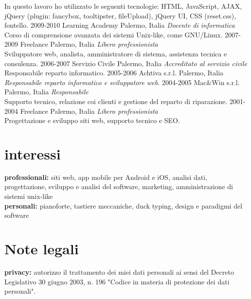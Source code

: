 \documentclass[]{friggeri-cv} %
\begin{document}
\begin{entrylist}
{In questo lavoro ho utilizzato le seguenti tecnologie: HTML,
JavaScript, AJAX, jQuery (plugin: fancybox, tooltipster, fileUpload),
jQuery UI, CSS (reset.css), fontello.
}
\entry
{2009-2010}
{Learning Academy}
{Palermo, Italia}
{\emph{Docente di informatica} \\
Corso di comprensione avanzata dei sistemi Unix-like, come GNU/Linux.
}
\entry
{2007-2009}
{Freelance}
{Palermo, Italia}
{\emph{Libero professionista} \\
Sviluppatore web, analista, amministratore di sistema, assistenza tecnica e consulenza.
}
\entry
{2006-2007}
{Servizio Civile}
{Palermo, Italia}
{\emph{Accreditato al servizio civile} \\
Responsabile reparto informatico.
}
\entry
{2005-2006}
{Achtiva s.r.l.}
{Palermo, Italia}
{\emph{Responsabile reparto informatico e sviluppatore web.} }
\entry
{2004-2005}
{Mac\&Win s.r.l.}
{Palermo, Italia}
{\emph{Responsabile} \\
Supporto tecnico, relazione coi clienti e gestione del reparto di riparazione.
}
\entry
{2001-2004}
{Freelance}
{Palermo, Italia}
{\emph{Libero professionista} \\
Progettazione e sviluppo siti web, supporto tecnico e SEO.
}
\end{entrylist}

\section{interessi}
\textbf{professionali:} siti web, app mobile per Android e iOS, analisi dati,
progettazione, sviluppo e analisi del software, marketing, amministrazione di
sistemi unix-like \\
\textbf{personali:} pianoforte, tastiere meccaniche, duck typing, design e
paradigmi del software

\section{Note legali}
\textbf{privacy:} autorizzo il trattamento dei miei dati personali ai sensi del Decreto
Legislativo 30 giugno 2003, n. 196  "Codice in materia di protezione dei dati
personali".
\end{document}
